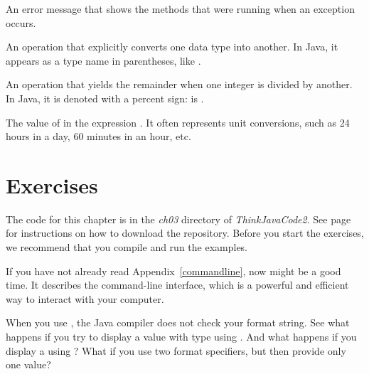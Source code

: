 \begin{description}
An error message that shows the methods that were running when an exception occurs.

An operation that explicitly converts one data type into another.
In Java, it appears as a type name in parentheses, like .


An operation that yields the remainder when one integer is divided by another.
In Java, it is denoted with a percent sign:  is .

The value of  in the expression .
It often represents unit conversions, such as 24 hours in a day, 60 minutes in an hour, etc.

\end{description}


\section{Exercises}

The code for this chapter is in the {\it ch03} directory of {\it ThinkJavaCode2}.
See page~\pageref{code} for instructions on how to download the repository.
Before you start the exercises, we recommend that you compile and run the examples.

If you have not already read Appendix~\ref{commandline}, now might be a good time.
It describes the command-line interface, which is a powerful and efficient way to interact with your computer.


\begin{exercise}  %

When you use , the Java compiler does not check your format string.
See what happens if you try to display a value with type  using .
And what happens if you display a  using ?
What if you use two format specifiers, but then provide only one value?

\end{exercise}




